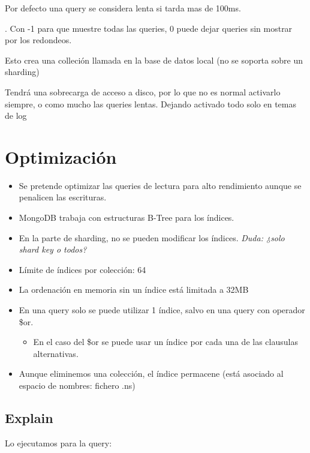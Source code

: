 \documentclass[a4paper,10pt,english]{sphinxmanual}
\begin{document}
Por defecto una query se considera lenta si tarda mas de 100ms.

. Con -1 para que muestre todas las queries, 0 puede dejar queries sin mostrar por los redondeos.

Esto crea una colleción llamada  en la base de datos local (no se soporta sobre un sharding)

Tendrá una sobrecarga de acceso a disco, por lo que no es normal activarlo siempre, o como mucho las queries lentas. Dejando activado todo solo en temas de log


\chapter{Optimización}
\label{contents/optimizing::doc}\label{contents/optimizing:optimizacion}\begin{itemize}
\item {} 
Se pretende optimizar las queries de lectura para alto rendimiento aunque se penalicen las escrituras.

\item {} 
MongoDB trabaja con estructuras B-Tree para los índices.

\item {} 
En la parte de sharding, no se pueden modificar los índices. \emph{Duda: ¿solo shard key o todos?}

\item {} 
Límite de índices por colección: 64

\item {} 
La ordenación en memoria sin un índice está limitada a 32MB

\item {} 
En una query solo se puede utilizar 1 índice, salvo en una query con operador \$or.
\begin{itemize}
\item {} 
En el caso del \$or se puede usar un índice por cada una de las clausulas alternativas.

\end{itemize}

\item {} 
Aunque eliminemos una colección, el índice permacene (está asociado al espacio de nombres: fichero .ns)

\end{itemize}


\section{Explain}
\label{contents/optimizing:explain}
Lo ejecutamos para la query:
\end{document}
